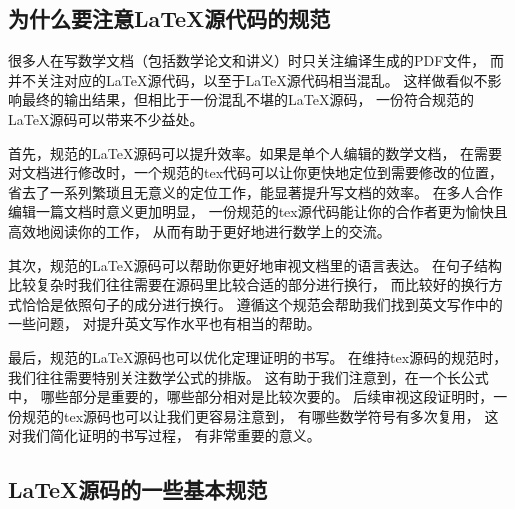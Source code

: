 \subsection{为什么要注意\LaTeX 源代码的规范}

很多人在写数学文档（包括数学论文和讲义）时只关注编译生成的PDF文件，
而并不关注对应的\LaTeX 源代码，以至于\LaTeX 源代码相当混乱。
这样做看似不影响最终的输出结果，但相比于一份混乱不堪的\LaTeX 源码，
一份符合规范的\LaTeX 源码可以带来不少益处。

首先，规范的\LaTeX 源码可以提升效率。如果是单个人编辑的数学文档，
在需要对文档进行修改时，一个规范的tex代码可以让你更快地定位到需要修改的位置，
省去了一系列繁琐且无意义的定位工作，能显著提升写文档的效率。
在多人合作编辑一篇文档时意义更加明显，
一份规范的tex源代码能让你的合作者更为愉快且高效地阅读你的工作，
从而有助于更好地进行数学上的交流。

其次，规范的\LaTeX 源码可以帮助你更好地审视文档里的语言表达。
在句子结构比较复杂时我们往往需要在源码里比较合适的部分进行换行，
而比较好的换行方式恰恰是依照句子的成分进行换行。
遵循这个规范会帮助我们找到英文写作中的一些问题，
对提升英文写作水平也有相当的帮助。

最后，规范的\LaTeX 源码也可以优化定理证明的书写。
在维持tex源码的规范时，我们往往需要特别关注数学公式的排版。
这有助于我们注意到，在一个长公式中，
哪些部分是重要的，哪些部分相对是比较次要的。
后续审视这段证明时，一份规范的tex源码也可以让我们更容易注意到，
有哪些数学符号有多次复用，
这对我们简化证明的书写过程，
有非常重要的意义。


\subsection{\LaTeX 源码的一些基本规范}


